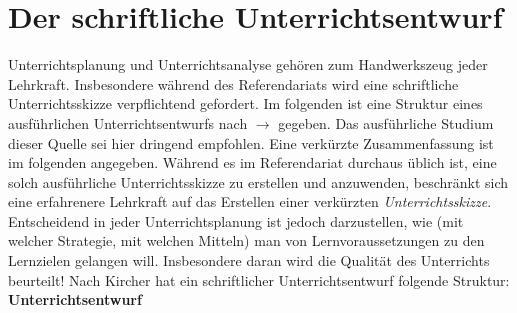 \chapter{Der schriftliche Unterrichtsentwurf}\label{Entwurf}

Unterrichtsplanung und Unterrichtsanalyse geh\"{o}ren zum Handwerkszeug jeder Lehrkraft. Insbesondere w\"{a}hrend des Referendariats wird eine schriftliche Unterrichtsskizze verpflichtend gefordert. Im folgenden ist eine Struktur eines ausf\"{u}hrlichen Unterrichtsentwurfs nach $\to$ \textcite{kircherPlanungUndAnalyse2015} gegeben. Das ausf\"{u}hrliche Studium dieser Quelle sei hier dringend empfohlen. Eine verk\"{u}rzte Zusammenfassung ist im folgenden angegeben. W\"{a}hrend es im Referendariat durchaus \"{u}blich ist, eine solch ausf\"{u}hrliche Unterrichtsskizze zu erstellen und anzuwenden, beschr\"{a}nkt sich eine erfahrenere Lehrkraft auf das Erstellen einer verk\"{u}rzten \emph{Unterrichtsskizze}. Entscheidend in jeder Unterrichtsplanung ist jedoch darzustellen, wie (mit welcher Strategie, mit welchen Mitteln) man von Lernvoraussetzungen zu den Lernzielen gelangen will. Insbesondere daran wird die Qualit\"{a}t des Unterrichts beurteilt! 
\mip
Nach Kircher hat ein schriftlicher Unterrichtsentwurf folgende Struktur:
\bip
\textbf{Unterrichtsentwurf} 

